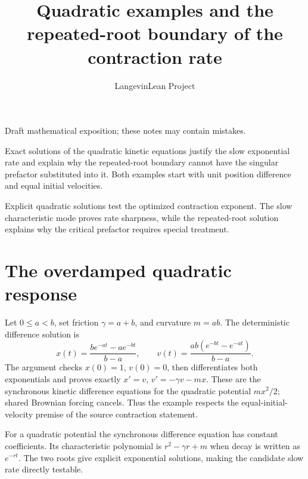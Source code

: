 \documentclass[11pt,a4paper]{article}
\title{\texorpdfstring{Quadratic examples and the repeated-root boundary of the contraction rate}{Quadratic examples and the repeated-root boundary of the contraction rate}}
\author{LangevinLean Project}
\date{}
\begin{document}
\maketitle
Draft mathematical exposition; these notes may contain mistakes.


Exact solutions of the quadratic kinetic equations justify the slow exponential rate and explain why the repeated-root boundary cannot have the singular prefactor substituted into it. Both examples start with unit position difference and equal initial velocities.



Explicit quadratic solutions test the optimized contraction exponent. The slow characteristic mode proves rate sharpness, while the repeated-root solution explains why the critical prefactor requires special treatment.


\section{\texorpdfstring{The overdamped quadratic response}{The overdamped quadratic response}}


Let \(0\le a<b\), set friction \(\gamma=a+b\), and curvature \(m=ab\). The deterministic difference solution is \[x(t)=\frac{be^{-at}-ae^{-bt}}{b-a},\qquad v(t)=\frac{ab(e^{-bt}-e^{-at})}{b-a}.\] The argument checks \(x(0)=1\), \(v(0)=0\), then differentiates both exponentials and proves exactly \(x\prime=v\), \(v\prime=-\gamma v-mx\). These are the synchronous kinetic difference equations for the quadratic potential \(mx^2/2\); shared Brownian forcing cancels. Thus the example respects the equal-initial-velocity premise of the source contraction statement.



For a quadratic potential the synchronous difference equation has constant coefficients. Its characteristic polynomial is \(r^2-\gamma r+m\) when decay is written as \(e^{-rt}\). The two roots give explicit exponential solutions, making the candidate slow rate directly testable.
\end{document}
